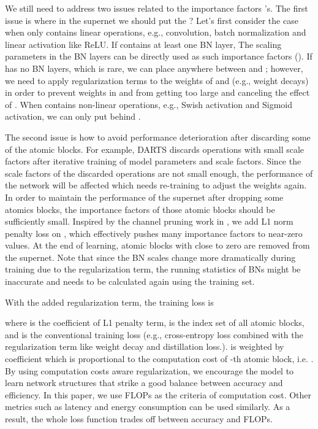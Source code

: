\documentclass{article} \usepackage{iclr2020_conference,times}
\newcommand{\flops}{FLOPs\xspace}
\begin{document}
We still need to address two issues related to the importance factors 's. The first issue is where in the supernet we should put the ? Let's first consider the case when  only contains linear operations, e.g., convolution, batch normalization and linear activation like ReLU. If  contains at least one BN layer, The scaling parameters in the BN layers can be directly used as such importance factors (\cite{zhuang2017slimming}). If  has no BN layers, which is rare, we can place  anywhere between  and ; however, we need to apply regularization terms to the weights of  and  (e.g., weight decays) in order to prevent weights in  and  from getting too large and canceling the effect of . When  contains non-linear operations, e.g., Swish activation and Sigmoid activation, we can only put  behind .


The second issue is how to avoid performance deterioration after discarding some of the atomic blocks. For example, DARTS discards operations with small scale factors after iterative training of model parameters and scale factors. Since the scale factors of the discarded operations are not small enough, the performance of the network will be affected which needs re-training to adjust the weights again. In order to maintain the performance of the supernet after dropping some atomics blocks, the importance factors  of those atomic blocks should be sufficiently small. Inspired by the channel pruning work in \cite{zhuang2017slimming}, we add L1 norm penalty loss on , which effectively pushes many importance factors to near-zero values. At the end of learning, atomic blocks with  close to zero are removed from the supernet. Note that since the BN scales change more dramatically during training due to the regularization term, the running statistics of BNs might be inaccurate and needs to be calculated again using the training set.

With the added regularization term, the training loss is



where  is the coefficient of L1 penalty term,  is the index set of all atomic blocks, and  is the conventional training loss (e.g., cross-entropy loss combined with 
the regularization term like weight decay and distillation loss.).  is weighted by coefficient  which is proportional to the computation cost of -th atomic block, i.e. . By using computation costs aware regularization, we encourage the model to learn network structures that strike a good balance between accuracy and efficiency.  In this paper, we use FLOPs as the criteria of computation cost. Other metrics such as latency and energy consumption can be used similarly. As a result, the whole loss function  trades off between accuracy and \flops.
\end{document}
